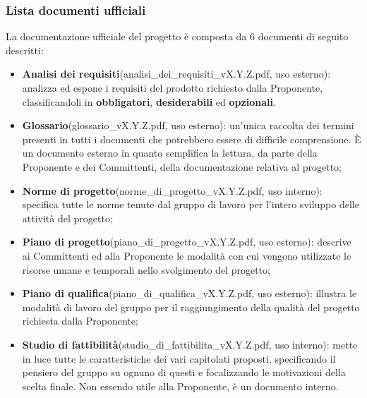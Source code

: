 	\subsubsection{Lista documenti ufficiali}
	La documentazione ufficiale del progetto è composta da 6 documenti di seguito descritti:
	\begin{itemize}
		\item \textbf{Analisi dei requisiti}(analisi\_dei\_requisiti\_vX.Y.Z.pdf, uso esterno): analizza ed espone i requisiti del prodotto richiesto dalla Proponente, classificandoli in \textbf{obbligatori}, \textbf{desiderabili} ed \textbf{opzionali}.
		\item \textbf{Glossario}(glossario\_vX.Y.Z.pdf, uso esterno): un'unica raccolta dei termini presenti in tutti i documenti che potrebbero essere di difficile comprensione. È un documento esterno in quanto semplifica la lettura, da parte della Proponente e dei Committenti, della documentazione relativa al progetto;
		\item \textbf{Norme di progetto}(norme\_di\_progetto\_vX.Y.Z.pdf, uso interno): specifica tutte le norme tenute dal gruppo di lavoro per l'intero sviluppo delle attività del progetto;
		\item \textbf{Piano di progetto}(piano\_di\_progetto\_vX.Y.Z.pdf, uso esterno): descrive ai Committenti ed alla Proponente le modalità con cui vengono utilizzate le risorse umane e temporali nello svolgimento del progetto;
		\item \textbf{Piano di qualifica}(piano\_di\_qualifica\_vX.Y.Z.pdf, uso esterno): illustra le modalità di lavoro del gruppo per il raggiungimento della qualità del progetto richiesta dalla Proponente;
		\item \textbf{Studio di fattibilità}(studio\_di\_fattibilita\_vX.Y.Z.pdf, uso interno): mette in luce tutte le caratteristiche dei vari capitolati proposti, specificando il pensiero del gruppo su ognuno di questi e focalizzando le motivazioni della scelta finale. Non essendo utile alla Proponente, è un documento interno.
	\end{itemize}

